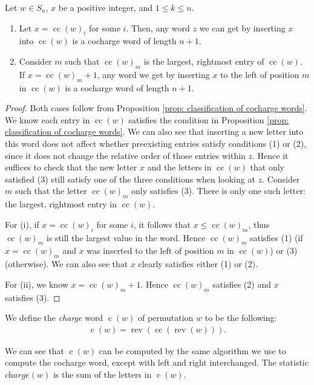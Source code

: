 \documentclass[ALCO, Unicode]{cedram}
\DeclareMathOperator{\rev}{rev}
\DeclareMathOperator{\cc}{cc}
\DeclareMathOperator{\cw}{c}
\begin{document}
\begin{lemma}\label{lemma: adding a repeated cocharge value is still a cc word}
Let $w\in S_n$, $x$ be a positive integer, and $1\leq k\leq n$. 
\begin{enumerate}[label=(\roman*)]
    \item Let $x = \cc(w)_i$ for some $i$. Then, any word $z$ we can get by inserting $x$ into $\cc(w)$ is a cocharge word of length $n+1$.
    \item Consider $m$ such that $\cc(w)_m$ is the largest, rightmost entry of $\cc(w)$. If $x = \cc(w)_m + 1$, any word we get by inserting $x$ to the left of position $m$ in $\cc(w)$ is a cocharge word of length $n+1$.
\end{enumerate}

\end{lemma}
\begin{proof}
Both cases follow from Proposition \ref{prop: classification of cocharge words}.
We know each entry in  $\cc(w)$ satisfies the condition in Proposition \ref{prop: classification of cocharge words}. We can also see that inserting a new letter into this word does not affect whether preexisting entries satisfy conditions (1) or (2), since it does not change the relative order of those entries within $z$. 
Hence it suffices to check that the new letter $x$ and the letters in $\cc(w)$ that only satisfied (3) still satisfy one of the three conditions when looking at $z$.
 Consider $m$ such that the letter $\cc(w)_m$ only satisfies (3). There is only one such letter: the largest, rightmost entry in $\cc(w)$. 

 For (i),  if $x = \cc(w)_i$ for some $i$, it follows that  $x \leq \cc(w)_m$, thus $\cc(w)_m$ is still the largest value in the word. Hence $\cc(w)_m$ satisfies (1) (if $x = \cc(w)_m$ and $x$ was inserted to the left of position $m$ in $\cc(w)$)  or (3) (otherwise). We can also see that $x$ clearly satisfies either (1) or (2).

 For (ii), we know $x = \cc(w)_m+1$. Hence $\cc(w)_m$ satisfies (2) and $x$ satisfies (3).   
\end{proof}


We define the \textit{charge} word $\cw(w)$ of permutation $w$ to be the following: 
\begin{align}\label{eq: charge is reverse of cocharge of reverse}
    \cw(w)  = \rev(\cc(\rev(w))).
\end{align}

We can see that $\cw(w)$ can be computed by the same algorithm we use to compute the cocharge word, except with left and right interchanged. The statistic $\textit{charge}(w)$  is the sum of the letters in $\cw(w)$. 
\end{document}
